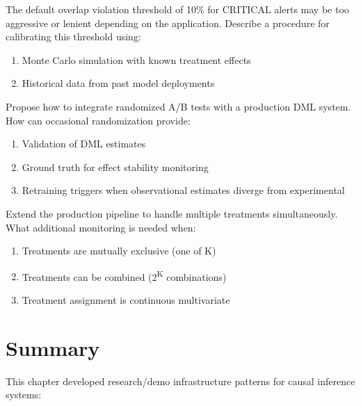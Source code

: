 \begin{exercise}
The default overlap violation threshold of 10\% for CRITICAL alerts may be too aggressive or lenient depending on the application. Describe a procedure for calibrating this threshold using:
\begin{enumerate}
    \item Monte Carlo simulation with known treatment effects
    \item Historical data from past model deployments
\end{enumerate}
\end{exercise}

\begin{exercise}
Propose how to integrate randomized A/B tests with a production DML system. How can occasional randomization provide:
\begin{enumerate}
    \item Validation of DML estimates
    \item Ground truth for effect stability monitoring
    \item Retraining triggers when observational estimates diverge from experimental
\end{enumerate}
\end{exercise}

\begin{exercise}
Extend the production pipeline to handle multiple treatments simultaneously. What additional monitoring is needed when:
\begin{enumerate}
    \item Treatments are mutually exclusive (one of K)
    \item Treatments can be combined (2\textsuperscript{K} combinations)
    \item Treatment assignment is continuous multivariate
\end{enumerate}
\end{exercise}


\section{Summary}\label{sec:ch10_summary}

This chapter developed research/demo infrastructure patterns for causal inference systems:


